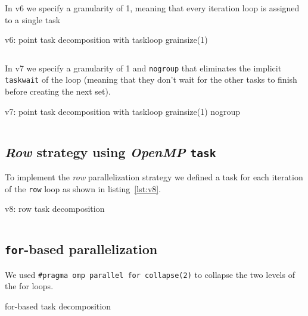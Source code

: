 In v6 we specify a granularity of 1, meaning that every iteration loop is assigned to a single task

\begin{listing}[H]
    \centering
    \caption{v6: point task decomposition with taskloop grainsize(1)}
    \inputminted[firstline=91,lastline=98]{c}{sources/mandel-omp-v6.c}
    \label{lst:v6} 
\end{listing}

In v7 we specify a granularity of 1 and \texttt{nogroup} that eliminates the implicit \texttt{taskwait}
of the loop (meaning that they don't wait for the other tasks to finish before creating the next set).

\begin{listing}[H]
    \centering
    \caption{v7: point task decomposition with taskloop grainsize(1) nogroup}
    \inputminted[firstline=91,lastline=98]{c}{sources/mandel-omp-v7.c}
    \label{lst:v7} 
\end{listing}

\subsection{\emph{Row} strategy using \emph{OpenMP} \texttt{task}}%

To implement the \emph{row} parallelization strategy we defined a task for each iteration of
the \texttt{row} loop as shown in listing~\ref{lst:v8}.

\begin{listing}[H]
    \centering
    \caption{v8: row task decomposition}
    \inputminted[firstline=91,lastline=98]{c}{sources/mandel-omp-v8.c}
    \label{lst:v8} 
\end{listing}

\subsection{\texttt{for}-based parallelization}%

We used \texttt{\#pragma omp parallel for collapse(2)} to collapse the two levels of the for loops.

\begin{listing}[H]
    \centering
    \caption{for-based task decomposition}
    \inputminted[firstline=91,lastline=96]{c}{sources/mandel-omp-v11.c}
    \label{lst:v11} 
\end{listing}


